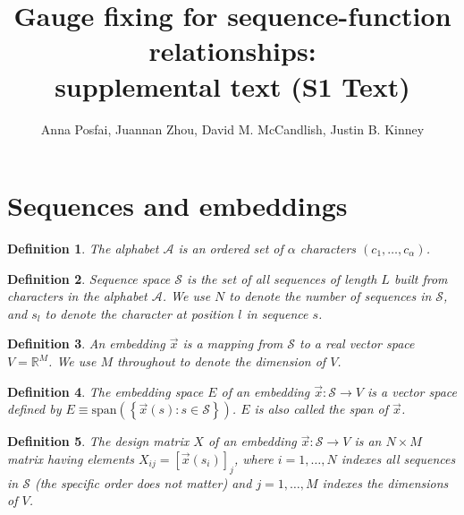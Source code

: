 \documentclass{article}
\title{Gauge fixing for sequence-function relationships:\\supplemental text (S1 Text)}
\author{Anna Posfai, Juannan Zhou, David M. McCandlish, Justin B. Kinney}
\numberwithin{myclaim}{section}
\newcommand{\set}[1]{\left\{ #1 \right\}}
\newtheorem{definition}{Definition}
\begin{document}
\maketitle
\tableofcontents

\section{Sequences and embeddings}

\begin{definition} \label{def:alphabet}
    The alphabet $\mathcal{A}$ is an ordered set of $\alpha$ characters $(c_1, \ldots, c_\alpha)$.
\end{definition}

\begin{definition} \label{def:sequence_space}
    Sequence space $\mathcal{S}$ is the set of all sequences of length $L$ built from characters in the alphabet $\mathcal{A}$. We use $N$ to denote the number of sequences in $\mathcal{S}$, and $s_l$ to denote the character at position $l$ in sequence $s$.
\end{definition}

\begin{definition} \label{def:embedding}
An embedding $\vec{x}$ is a mapping from $\mathcal{S}$ to a real vector space $V = \mathbb{R}^M$. We use $M$ throughout to denote the dimension of $V$. 
\end{definition}


\begin{definition} \label{def:embedding_space}
The embedding space $E$ of an embedding $\vec{x}:\mathcal{S} \to V$ is a vector space defined by $E \equiv \mathrm{span}(\set{\vec{x}(s): s \in \mathcal{S}})$. $E$ is also called the span of $\vec{x}$.
\end{definition}

\begin{definition}
The design matrix $X$ of an embedding $\vec{x}:\mathcal{S} \to V$ is an $N \times M$ matrix having elements $X_{ij} = [\vec{x}(s_i)]_j$, where $i = 1, \ldots, N$ indexes all sequences in $\mathcal{S}$ (the specific order does not matter) and $j = 1, \ldots, M$ indexes the dimensions of $V$.    
\end{definition}
\end{document}
